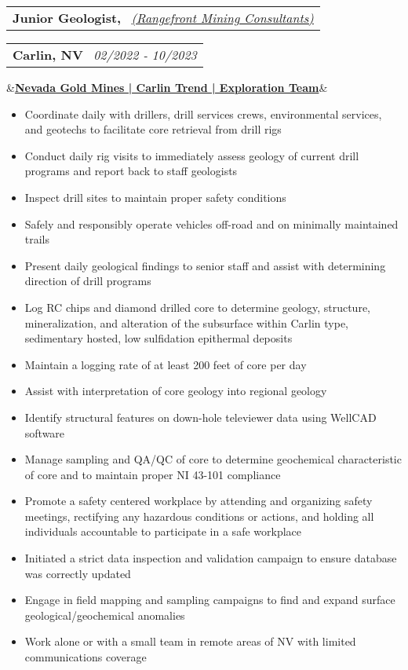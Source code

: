 \documentclass[12pt,a4paper,sans]{moderncv}
\makeatletter
\newcommand*{\customcventry}[7][.13em]{
\begin{tabular}{@{}l}
{\bfseries #4} \
{\itshape #3}
\end{tabular}
\hfill
\begin{tabular}{l@{}}
{\bfseries #5} \
{\itshape #2}
\end{tabular}
\ifx&#7&%
\else{\
\begin{minipage}{\maincolumnwidth}%
\small#7%
\end{minipage}}\fi%
\par\addvspace{#1}}
\makeatother
\begin{document}
\customcventry{02/2022 ‐ 10/2023}{{\color{blue}\href{https://www.rangefront.com/}{(Rangefront Mining Consultants)}}}{Junior Geologist,}{Carlin, NV}{}{\color{blue}\href{https://www.barrick.com/English/operations/nevada-gold-mines/default.aspx}{\color{blue}\textbf{Nevada Gold Mines | Carlin Trend | Exploration Team}}}
\vspace{-1mm}
{\begin{itemize}[noitemsep, leftmargin=0.6cm, label={\textbullet}]
\item Coordinate daily with drillers, drill services crews, environmental services, and geotechs to facilitate core retrieval from drill rigs
\item Conduct daily rig visits to immediately assess geology of current drill programs and report back to staff geologists
\item Inspect drill sites to maintain proper safety conditions 
\item Safely and responsibly operate vehicles off-road and on minimally maintained trails 
\item Present daily geological findings to senior staff and assist with determining direction of drill programs 
\item Log RC chips and diamond drilled core to determine geology, structure, mineralization, and alteration of the subsurface within Carlin type, sedimentary hosted, low sulfidation epithermal deposits 
\item Maintain a logging rate of at least 200 feet of core per day
\item Assist with interpretation of core geology into regional geology 
\item Identify structural features on down-hole televiewer data using WellCAD software 
\item Manage sampling and QA/QC of core to determine geochemical characteristic of core and to maintain proper NI 43-101 compliance
\item Promote a safety centered workplace by attending and organizing safety meetings, rectifying any hazardous conditions or actions, and holding all individuals accountable to participate in a safe workplace
\item Initiated a strict data inspection and validation campaign to ensure database was correctly updated
\item Engage in field mapping and sampling campaigns to find and expand surface geological/geochemical anomalies
\item Work alone or with a small team in remote areas of NV with limited communications coverage
\end{itemize}}
\end{document}

